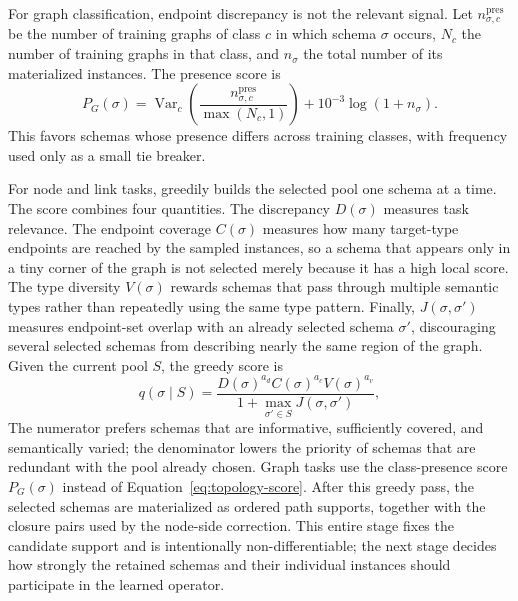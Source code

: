 For graph classification, endpoint discrepancy is not the relevant signal.  Let
\(n_{\sigma,c}^{\mathrm{pres}}\) be the number of training graphs of class \(c\) in which schema
\(\sigma\) occurs, \(N_c\) the number of training graphs in that class, and \(n_\sigma\) the total
number of its materialized instances.  The presence score is
\begin{equation}
  P_G(\sigma)
  =\operatorname{Var}_{c}\!\left(
    \frac{n_{\sigma,c}^{\mathrm{pres}}}{\max(N_c,1)}
  \right)+10^{-3}\log(1+n_\sigma).
  \label{eq:graph-presence-score}
\end{equation}
This favors schemas whose presence differs across training classes, with frequency used only as a
small tie breaker.

For node and link tasks, \ampss{} greedily builds the selected pool one schema at a time.  The
score combines four quantities.  The discrepancy \(D(\sigma)\) measures task relevance.  The
endpoint coverage \(C(\sigma)\) measures how many target-type endpoints are reached by the sampled
instances, so a schema that appears only in a tiny corner of the graph is not selected merely
because it has a high local score.  The type diversity \(V(\sigma)\) rewards schemas that pass
through multiple semantic types rather than repeatedly using the same type pattern.  Finally,
\(J(\sigma,\sigma')\) measures endpoint-set overlap with an already selected schema
\(\sigma'\), discouraging several selected schemas from describing nearly the same region of the
graph.  Given the current pool \(S\), the greedy score is
\begin{equation}
  q(\sigma\mid S)=
  \frac{D(\sigma)^{a_d}C(\sigma)^{a_c}V(\sigma)^{a_v}}
       {1+\max_{\sigma'\in S}J(\sigma,\sigma')} ,
  \label{eq:topology-score}
\end{equation}
The numerator prefers schemas that are informative, sufficiently covered, and semantically varied;
the denominator lowers the priority of schemas that are redundant with the pool already chosen.
Graph tasks use the class-presence score \(P_G(\sigma)\) instead of Equation~\ref{eq:topology-score}.
After this greedy pass, the selected schemas are materialized as ordered path supports, together
with the closure pairs used by the node-side correction.  This entire stage fixes the candidate
support and is intentionally non-differentiable; the next stage decides how strongly the retained
schemas and their individual instances should participate in the learned operator.

